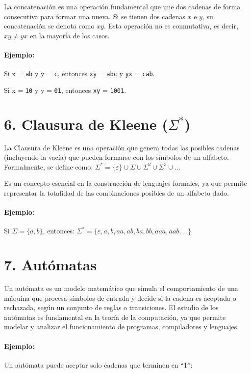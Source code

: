\documentclass{article}
\begin{document}
La concatenación es una operación fundamental que une dos cadenas de forma consecutiva para formar una nueva.
Si se tienen dos cadenas $x$ e $y$, su concatenación se denota como $xy$.
Esta operación no es conmutativa, es decir, $xy \neq yx$ en la mayoría de los casos.

\paragraph{Ejemplo:}

Si x = \texttt{ab} y y = \texttt{c}, entonces \texttt{xy} = \texttt{abc} y \texttt{yx} = \texttt{cab}.

Si x = \texttt{10} y y = \texttt{01}, entonces \texttt{xy} = \texttt{1001}.

\section{6. Clausura de Kleene ($\Sigma^*$)}

La Clausura de Kleene es una operación que genera todas las posibles cadenas (incluyendo la vacía) que pueden formarse con los símbolos de un alfabeto.
Formalmente, se define como:
$\Sigma^* = \{\varepsilon\} \cup \Sigma \cup \Sigma^2 \cup \Sigma^3 \cup \dots$

Es un concepto esencial en la construcción de lenguajes formales, ya que permite representar la totalidad de las combinaciones posibles de un alfabeto dado.

\paragraph{Ejemplo:}
Si $\Sigma = \{a, b\}$, entonces:
$\Sigma^* = \{\varepsilon, a, b, aa, ab, ba, bb, aaa, aab, \dots\}$

\section{7. Autómatas}

Un autómata es un modelo matemático que simula el comportamiento de una máquina que procesa símbolos de entrada y decide si la cadena es aceptada o rechazada, según un conjunto de reglas o transiciones.
El estudio de los autómatas es fundamental en la teoría de la computación, ya que permite modelar y analizar el funcionamiento de programas, compiladores y lenguajes.

\paragraph{Ejemplo:}
Un autómata puede aceptar solo cadenas que terminen en ``1'':
\end{document}
